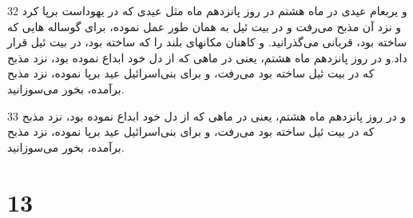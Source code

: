 \par 32 و یربعام عیدی در ماه هشتم در روز پانزدهم ماه مثل عیدی که در یهوداست برپا کرد و نزد آن مذبح می‌رفت و در بیت ئیل به همان طور عمل نموده، برای گوساله هایی که ساخته بود، قربانی می‌گذرانید. و کاهنان مکانهای بلند را که ساخته بود، در بیت ئیل قرار داد.و در روز پانزدهم ماه هشتم، یعنی در ماهی که از دل خود ابداع نموده بود، نزد مذبح که در بیت ئیل ساخته بود می‌رفت، و برای بنی‌اسرائیل عید برپا نموده، نزد مذبح برآمده، بخور می‌سوزانید.
\par 33 و در روز پانزدهم ماه هشتم، یعنی در ماهی که از دل خود ابداع نموده بود، نزد مذبح که در بیت ئیل ساخته بود می‌رفت، و برای بنی‌اسرائیل عید برپا نموده، نزد مذبح برآمده، بخور می‌سوزانید.
 
\chapter{13}

